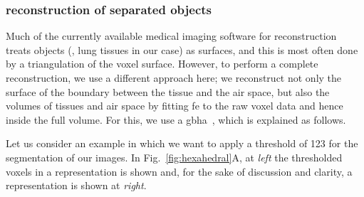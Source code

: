 \subsubsection{\threed reconstruction of separated objects}
Much of the currently available medical imaging software for \threed reconstruction treats objects (\ie, lung tissues in our case) as surfaces, and this is most often done by a triangulation of the voxel surface. However, to perform a complete \threed reconstruction, we use a different approach here; we reconstruct not only the surface of the boundary between the tissue and the air space, but also the volumes of tissues and air space by fitting \ac{fe} to the raw voxel data and hence inside the full volume. For this, we use a \ac{gbha}~\cite{Schneiders1996}, which is explained as follows.

Let us consider an example in which we want to apply a threshold of 123 for the segmentation of our images. In Fig.~\ref{fig:hexahedral}A, at \textit{left} the thresholded voxels in a \threed representation is shown and, for the sake of discussion and clarity, a \twod representation is shown at \textit{right}.
